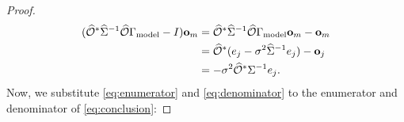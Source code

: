 \documentclass[ba]{imsart}
\newcommand{\obs}{\mathcal{O}}
\newcommand{\fwd}{\mathcal{F}}
\newcommand{\obsm}{\widehat{\obs}}
\newcommand{\Sigmam}{\widehat{\Sigma}}
\newcommand{\postcovm}{\widehat{\Gamma_{\textup{post}}}}
\newcommand{\tar}{\Psi}
\newcommand{\meas}{\mathbf{o}}
\theoremstyle{plain}
\theoremstyle{definition}
\theoremstyle{remark}
\providecommand{\DIFaddbegin}{} %
\providecommand{\DIFaddend}{} %
\providecommand{\DIFdelbegin}{} %
\providecommand{\DIFdelend}{} %
\newcommand{\DIFscaledelfig}{0.5}
\newlength{\DIFdelgraphicswidth} %
\newlength{\DIFdelgraphicsheight} %
\newcommand{\DIFaddincludegraphics}[2][]{{\color{blue}\fbox{\DIFOincludegraphics[#1]{#2}}}} %
\newcommand{\DIFdelincludegraphics}[2][]{%
\sbox{\DIFdelgraphicsbox}{\DIFOincludegraphics[#1]{#2}}%
\settoboxwidth{\DIFdelgraphicswidth}{\DIFdelgraphicsbox} %
\settoboxtotalheight{\DIFdelgraphicsheight}{\DIFdelgraphicsbox} %
\scalebox{\DIFscaledelfig}{%
\parbox[b]{\DIFdelgraphicswidth}{\usebox{\DIFdelgraphicsbox}\\[-\baselineskip] \rule{\DIFdelgraphicswidth}{0em}}\llap{\resizebox{\DIFdelgraphicswidth}{\DIFdelgraphicsheight}{%
\setlength{\unitlength}{\DIFdelgraphicswidth}%
\begin{picture}(1,1)%
\thicklines\linethickness{2pt} %
{\color[rgb]{1,0,0}\put(0,0){\framebox(1,1){}}}%
{\color[rgb]{1,0,0}\put(0,0){\line( 1,1){1}}}%
{\color[rgb]{1,0,0}\put(0,1){\line(1,-1){1}}}%
\end{picture}%
}\hspace*{3pt}}} %
} %
\DeclareRobustCommand{\DIFaddbegin}{\DIFOaddbegin \let\includegraphics\DIFaddincludegraphics} %
\DeclareRobustCommand{\DIFaddend}{\DIFOaddend \let\includegraphics\DIFOincludegraphics} %
\DeclareRobustCommand{\DIFdelbegin}{\DIFOdelbegin \let\includegraphics\DIFdelincludegraphics} %
\DeclareRobustCommand{\DIFdelend}{\DIFOaddend \let\includegraphics\DIFOincludegraphics} %
\begin{document}
\begin{proof}
\DIFdelend \DIFaddbegin \begin{align}\label{eq:enumerator}
    \begin{split}
      (\obsm^* \Sigmam^{-1} \obsm \modcov - I ) \meas_m
      &= \obsm^* \Sigmam^{-1} \obsm \modcov \meas_m - \meas_m \\
&= \obsm^* (e_j - \sigma^2 \Sigmam^{-1} e_j) -\meas_j \\ 
&= -\sigma^2 \obsm^* \Sigma^{-1}e_j. 
    \end{split}
  \end{align}\DIFaddend 
  Now, we substitute \eqref{eq:enumerator} and \eqref{eq:denominator}
  to the enumerator and denominator of \eqref{eq:conclusion}:
  \DIFdelbegin %

\end{proof}
\end{document}
